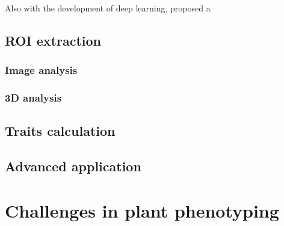 

Also with the development of deep learning, \citet{mildenhall_nerf_2022} proposed a 


\subsection{ROI extraction}

\subsubsection{Image analysis}



\subsubsection{3D analysis}





\subsection{Traits calculation}




\subsection{Advanced application}


\section{Challenges in plant phenotyping}



